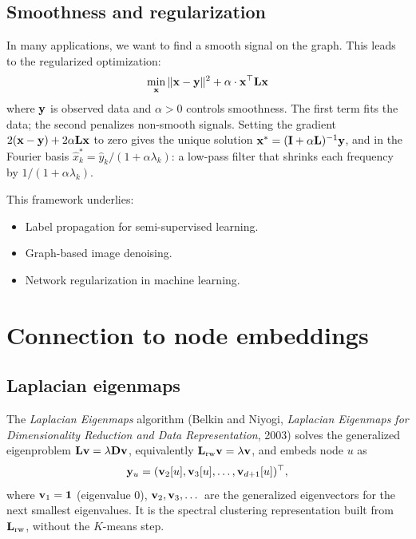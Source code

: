 \begin{notechapter}
\subsection{Smoothness and regularization}

\begin{keyidea}
In many applications, we want to find a smooth signal on the graph. This leads to the regularized optimization:
\begin{equation}
\min_{\mathbf{x}} \| \mathbf{x} - \mathbf{y} \|^2 + \alpha \cdot \mathbf{x}^\top \mathbf{L} \mathbf{x}
\end{equation}
where $\mathbf{y}$ is observed data and $\alpha > 0$ controls smoothness. The first term fits the data; the second penalizes non-smooth signals.
Setting the gradient $2(\mathbf{x} - \mathbf{y}) + 2\alpha\mathbf{L}\mathbf{x}$ to zero gives the unique solution $\mathbf{x}^* = (\mathbf{I} + \alpha\mathbf{L})^{-1}\mathbf{y}$, and in the Fourier
basis $\hat x^*_k = \hat y_k/(1 + \alpha\lambda_k)$: a low-pass filter that shrinks each frequency by $1/(1 + \alpha\lambda_k)$.

This framework underlies:
\begin{itemize}
    \item Label propagation for semi-supervised learning.
    \item Graph-based image denoising.
    \item Network regularization in machine learning.
\end{itemize}
\end{keyidea}

\section{Connection to node embeddings}

\subsection{Laplacian eigenmaps}

\begin{definition}\label{graph-laplacians:def:laplacian-eigenmaps}
The \emph{Laplacian Eigenmaps} algorithm (Belkin and Niyogi, \emph{Laplacian Eigenmaps for
Dimensionality Reduction and Data Representation}, 2003) solves the generalized eigenproblem
$\mathbf{L}\mathbf{v} = \lambda\mathbf{D}\mathbf{v}$, equivalently $\mathbf{L}_{\text{rw}}\mathbf{v} = \lambda\mathbf{v}$, and embeds node $u$ as
\begin{equation}
\mathbf{y}_u = (\mathbf{v}_2[u], \mathbf{v}_3[u], \ldots, \mathbf{v}_{d+1}[u])^\top,
\end{equation}
where $\mathbf{v}_1 = \mathbf{1}$ (eigenvalue $0$), $\mathbf{v}_2, \mathbf{v}_3,\dots$ are the generalized eigenvectors for the next smallest eigenvalues. It is
the spectral clustering representation built from $\mathbf{L}_{\text{rw}}$, without the $K$-means step.
\end{definition}


\end{notechapter}
